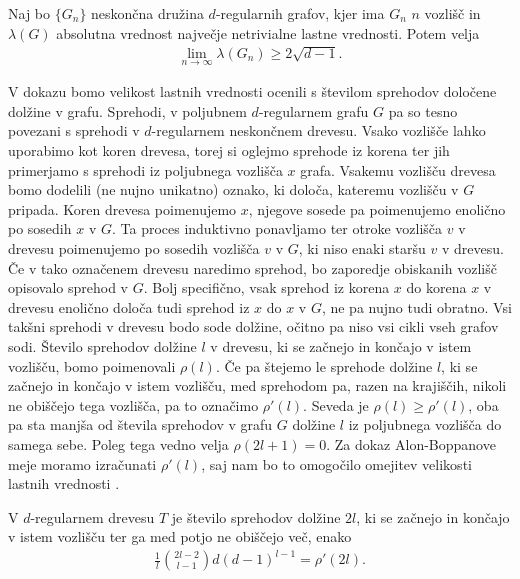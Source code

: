 \begin{izrek}
    \label{alon-boppanova-meja-izrek}
    Naj bo \(\{G_n\}\) neskončna družina \(d\)-regularnih grafov, kjer ima \(G_n\) \(n\) vozlišč in \(\lambda(G)\) absolutna vrednost največje netrivialne lastne vrednosti. Potem velja
    \begin{align*}
        \lim_{n\to\infty} \lambda(G_n) \geq 2\sqrt{d-1}.
    \end{align*}
\end{izrek}
V dokazu bomo velikost lastnih vrednosti ocenili s številom sprehodov določene dolžine v grafu. Sprehodi, v poljubnem \(d\)-regularnem grafu \(G\) pa so tesno povezani s sprehodi v \(d\)-regularnem neskončnem drevesu. Vsako vozlišče lahko uporabimo kot koren drevesa, torej si oglejmo sprehode iz korena ter jih primerjamo s sprehodi iz poljubnega vozlišča \(x\) grafa. Vsakemu vozlišču drevesa bomo dodelili (ne nujno unikatno) oznako, ki določa, kateremu vozlišču v \(G\) pripada. Koren drevesa poimenujemo \(x\), njegove sosede pa poimenujemo enolično po sosedih \(x\) v \(G\). Ta proces induktivno ponavljamo ter otroke vozlišča \(v\) v drevesu poimenujemo po sosedih vozlišča \(v\) v \(G\), ki niso enaki staršu \(v\) v drevesu. Če v tako označenem drevesu naredimo sprehod, bo zaporedje obiskanih vozlišč opisovalo sprehod v \(G\). Bolj specifično, vsak sprehod iz korena \(x\) do korena \(x\) v drevesu enolično določa tudi sprehod iz \(x\) do \(x\) v \(G\), ne pa nujno tudi obratno. Vsi takšni sprehodi v drevesu bodo sode dolžine, očitno pa niso vsi cikli vseh grafov sodi. Število sprehodov dolžine \(l\) v drevesu, ki se začnejo in končajo v istem vozlišču, bomo poimenovali \(\rho(l)\). Če pa štejemo le sprehode dolžine \(l\), ki se začnejo in končajo v istem vozlišču, med sprehodom pa, razen na krajiščih, nikoli ne obiščejo tega vozlišča, pa to označimo \(\rho'(l)\). Seveda je \(\rho(l)\geq \rho'(l)\), oba pa sta manjša od števila sprehodov v grafu \(G\) dolžine \(l\) iz poljubnega vozlišča do samega sebe. Poleg tega vedno velja \(\rho(2l+1)=0\). Za dokaz Alon-Boppanove meje moramo izračunati \(\rho'(l)\), saj nam bo to omogočilo omejitev velikosti lastnih vrednosti \cite{polatajko}.
\begin{lema}\label{alon:drevesa-meja}
    V \(d\)-regularnem drevesu \(T\) je število sprehodov dolžine \(2l\), ki se začnejo in končajo v istem vozlišču ter ga med potjo ne obiščejo več, enako
    \begin{align*}
        \frac{1}{l}\binom{2l-2}{l-1}d(d-1)^{l-1} = \rho'(2l).
    \end{align*}
\end{lema}
